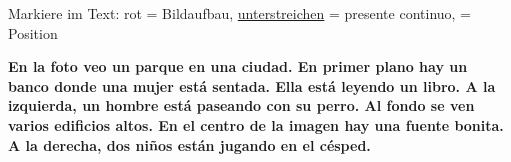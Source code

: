 \documentclass[10pt, a4paper]{article}
\newcommand{\es}[1]{\textbf{#1}}
\begin{document}
{\small Markiere im Text: \textcolor{akzent}{rot} = Bildaufbau, \underline{unterstreichen} = presente continuo,  = Position}

\vspace{6pt}

\begin{vokabelbox}[Musterbeschreibung]
\es{En la foto veo un parque en una ciudad. En primer plano hay un banco donde una mujer está sentada. Ella está leyendo un libro. A la izquierda, un hombre está paseando con su perro. Al fondo se ven varios edificios altos. En el centro de la imagen hay una fuente bonita. A la derecha, dos niños están jugando en el césped.}
\end{vokabelbox}

\vspace{6pt}
\end{document}
